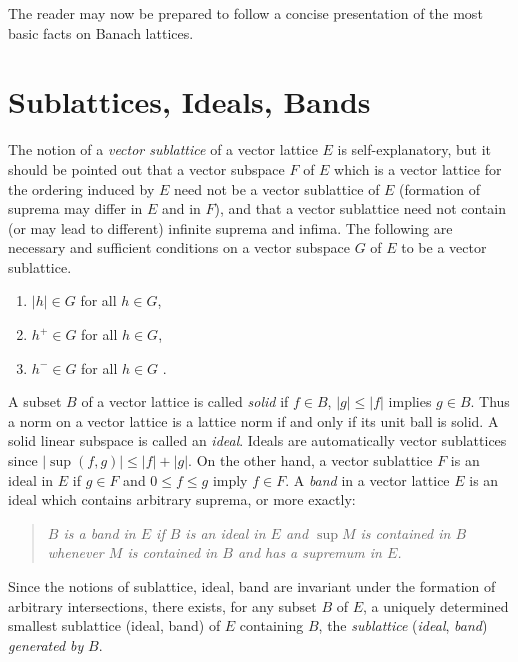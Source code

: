 The reader may now be prepared to follow a concise presentation of the most basic facts on Banach lattices.
\section{Sublattices, Ideals, Bands}\label{sec:c1-1}%

The notion of a \emph{vector sublattice} of a vector lattice $ E $ is self-explanatory, but it should be pointed out that a vector subspace $ F $ of $ E $ which is a vector lattice for the ordering induced by $ E $ need not be a vector sublattice of $ E $ (formation of suprema may differ in $ E $ and in $ F $), and that a vector sublattice need not contain (or may lead to different) infinite suprema and infima.
The following are necessary and sufficient conditions on a vector subspace $ G $ of $ E $ to be a vector sublattice.
\begin{enumerate}[\upshape (a)]
	\item 
	$ |h| \in G $ for all $ h \in G $, 

	\item 
	$ h^{+} \in G $ for all $ h \in G $, 
	
	\item 
	$ h^{-} \in G $ for all $ h \in G $ .
\end{enumerate}
A subset $ B $ of a vector lattice is called \emph{solid} if $ f \in B $, $ |g| \leq |f| $ implies $ g \in B $.
Thus a norm on a vector lattice is a lattice norm if and only if its unit ball is solid.
A solid linear subspace is called an \emph{ideal}.
Ideals are automatically vector sublattices since $ |\sup(f,g)| \leq |f| + |g| $.
On the other hand, a vector sublattice $ F $ is an ideal in $ E $ if $ g \in F $ and $ 0 \leq f \leq g $ imply $ f \in F $.
A \emph{band} in a vector lattice $ E $ is an ideal which contains arbitrary suprema, or more exactly: 
\begin{quote}
\textit{$ B $ is a band in $ E $ if $ B $ is an ideal in $ E $ and $ \sup M $ is contained in $ B $ whenever $ M $ is contained in $ B $ and has a supremum in $ E $.}
\end{quote}
Since the notions of sublattice, ideal, band are invariant under the formation of arbitrary intersections, there exists, for any subset $ B $ of $ E $, a uniquely determined smallest sublattice (ideal, band) of $ E $ containing $ B $, \ie the \emph{sublattice} (\emph{ideal}, \emph{band}) \emph{generated by} $ B $.

